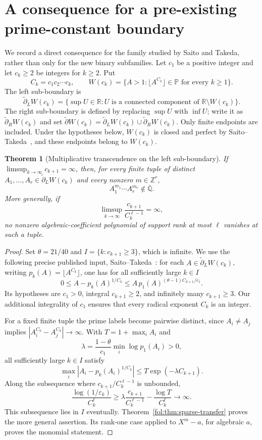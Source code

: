 \documentclass[11pt,a4paper]{article}
\newtheorem{theorem}{Theorem}[section]
\theoremstyle{definition}
\theoremstyle{remark}
\numberwithin{equation}{section}
\begin{document}
\section{A consequence for a pre-existing prime-constant boundary}
\label{fol:sec:boundary-transfer}

We record a direct consequence for the family studied by Saito and
Takeda, rather than only for the new binary subfamilies. Let $c_1$ be a
positive integer and let $c_k\ge2$ be integers for $k\ge2$. Put
\[
 C_k=c_1c_2\cdots c_k,\qquad
 W(c_k)=\{A>1:\lfloor A^{C_k}\rfloor\in\mathbb P
                    \text{ for every }k\ge1\}.
\]
The left sub-boundary is
\[
 \widetilde\partial_L W(c_k)
 =\{\sup U\in\mathbb R:U\text{ is a connected component of }
                          \mathbb R\setminus W(c_k)\}.
\]
The right sub-boundary is defined by replacing $\sup U$ with $\inf U$;
write it as $\widetilde\partial_R W(c_k)$ and set
$\widetilde\partial W(c_k)=\widetilde\partial_L W(c_k)
\cup\widetilde\partial_R W(c_k)$. Only finite endpoints are included.
Under the hypotheses below,
$W(c_k)$ is closed and perfect by
Saito--Takeda~\cite[Theorem~1.2]{SaitoTakeda2022}, and these endpoints
belong to $W(c_k)$.

\begin{theorem}[Multiplicative transcendence on the left sub-boundary]
\label{fol:thm:left-boundary-monomials}
If $\limsup_{k\to\infty}c_{k+1}=\infty$, then, for every finite tuple
of distinct
$A_1,\ldots,A_r\in\widetilde\partial_L W(c_k)$ and every nonzero
$m\in\mathbb Z^r$,
\[
 A_1^{m_1}\cdots A_r^{m_r}\notin\overline{\mathbb Q}.
\]
More generally, if
\[
 \limsup_{k\to\infty}\frac{c_{k+1}}{C_k^{\ell-1}}=\infty,
\]
no nonzero algebraic-coefficient polynomial of support rank at most
$\ell$ vanishes at such a tuple.
\end{theorem}

\begin{proof}
Set $\theta=21/40$ and $I=\{k:c_{k+1}\ge3\}$, which is infinite.
We use the following precise published input,
Saito--Takeda~\cite[Lemma~5.2(1)]{SaitoTakeda2022}: for each
$A\in\widetilde\partial_L W(c_k)$, writing
$p_k(A)=\lfloor A^{C_k}\rfloor$, one has for all sufficiently large
$k\in I$
\[
 0\le A-p_k(A)^{1/C_k}
 \le A\,p_1(A)^{(\theta-1)C_{k+1}/c_1}.
\]
Its hypotheses are $c_1>0$, integral $c_{k+1}\ge2$, and infinitely many
$c_{k+1}\ge3$. Our additional integrality of $c_1$ ensures that every
radical exponent $C_k$ is an integer.

For a fixed finite tuple the prime labels become pairwise distinct,
since $A_i\ne A_j$ implies
$|A_i^{C_k}-A_j^{C_k}|\to\infty$. With
$T=1+\max_i A_i$ and
\[
 \lambda=\frac{1-\theta}{c_1}\min_i\log p_1(A_i)>0,
\]
all sufficiently large $k\in I$ satisfy
\[
 \max_i|A_i-p_k(A_i)^{1/C_k}|
 \le T\exp(-\lambda C_{k+1}).
\]
Along the subsequence where $c_{k+1}/C_k^{\ell-1}$ is unbounded,
\[
 \frac{\log(1/\varepsilon_k)}{C_k^\ell}
 \ge\lambda\frac{c_{k+1}}{C_k^{\ell-1}}
       -\frac{\log T}{C_k^\ell}\longrightarrow\infty.
\]
This subsequence lies in $I$ eventually.
Theorem~\ref{fol:thm:sparse-transfer} proves the more general assertion.
Its rank-one case applied to $X^m-a$, for algebraic $a$, proves the
monomial statement.
\end{proof}
\end{document}
